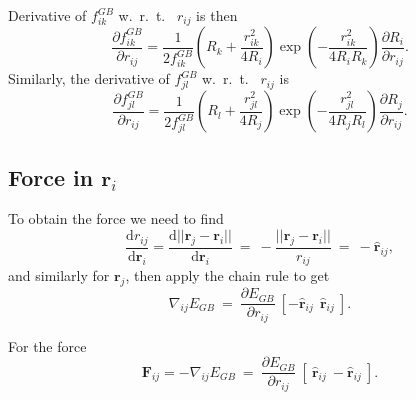 \documentclass[12pt]{article}
\begin{document}
Derivative of $f_{ik}^{GB}$  w.~r.~t.~ $r_{ij}$ is then
\begin{equation}
\label{eq:fklGBderv2}
\frac{\partial f_{ik}^{GB}}{\partial r_{ij}} = \frac{1}{2f_{ik}^{GB}} \left( R_{k} + \frac{r_{ik}^{2}}{4R_{i}} \right) \exp\left(-\frac{r_{ik}^{2}}{4R_{i}R_{k}}\right)\frac{\partial R_{i}}{\partial r_{ij}}.
\end{equation}
Similarly, the derivative of $f_{jl}^{GB}$  w.~r.~t.~ $r_{ij}$ is
\begin{equation}
\label{eq:fklGBderv3}
\frac{\partial f_{jl}^{GB}}{\partial r_{ij}} = \frac{1}{2f_{jl}^{GB}} \left( R_{l} + \frac{r_{jl}^{2}}{4R_{j}} \right) \exp\left(-\frac{r_{jl}^{2}}{4R_{j}R_{l}}\right)\frac{\partial R_{j}}{\partial r_{ij}}.
\end{equation}

\subsection{Force in $\mathbf{r}_i$}

To obtain the force we need to find
\begin{equation}
\frac{\mathrm{d}r_{ij}}{\mathrm{d}\mathbf{r}_i} =
\frac{\mathrm{d}||\mathbf{r}_j-\mathbf{r}_i||}{\mathrm{d}\mathbf{r}_i}~=~-\frac{||\mathbf{r}_j-\mathbf{r}_i||}{r_{ij}}~=~-\hat{\mathbf{r}}_{ij},
\end{equation}
and similarly for $\mathbf{r}_j$, then apply the chain rule to get
\begin{equation}
\label{nablaes}\nabla_{ij}E_{GB} ~=~ \frac{\partial E_{GB}}{\partial r_{ij}} ~[-\hat{\mathbf{r}}_{ij} ~~ \hat{\mathbf{r}}_{ij}~].
\end{equation}

For the force
\begin{equation}
\mathbf{F}_{ij} = -\nabla_{ij}E_{GB} ~=~ \frac{\partial E_{GB}}{\partial r_{ij}} ~[~\hat{\mathbf{r}}_{ij} ~ -\hat{\mathbf{r}}_{ij}~].
\end{equation}
\end{document}
